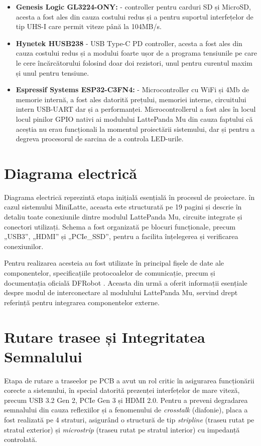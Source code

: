 \begin{itemize}
  \item \textbf{Genesis Logic GL3224-ONY:} - controller pentru carduri SD și MicroSD, acesta a fost ales din cauza costului redus și a pentru suportul interfețelor de tip UHS-I care permit viteze până la 104MB/s.
  \item \textbf{Hynetek HUSB238} -  USB Type-C PD controller, acesta a fost ales din cauza costului redus și a modului foarte ușor de a programa tensiunile pe care le cere încărcătorului folosind doar doi rezistori, unul pentru curentul maxim și unul pentru tensiune.
  \item \textbf{Espressif Systems ESP32-C3FN4:} - Microcontroller cu WiFi și 4Mb de memorie internă, a fost ales datorită prețului, memoriei interne, circuitului intern USB-UART dar și a performanței. Microcontrollerul a fost ales în locul locul pinilor GPIO nativi ai modulului LattePanda Mu din cauza faptului că aceștia nu erau funcționali la momentul proiectării sistemului, dar și pentru a degreva procesorul de sarcina de a controla LED-urile.
\end{itemize}


\section{Diagrama electrică}

Diagrama electrică reprezintă etapa inițială esențială în procesul de proiectare. în cazul sistemului MiniLatte, aceasta este structurată pe 19 pagini și descrie în detaliu toate conexiunile dintre modulul LattePanda Mu, circuite integrate și conectori utilizați. Schema a fost organizată pe blocuri funcționale, precum „USB3”, „HDMI” și „PCIe\_SSD”, pentru a facilita înțelegerea și verificarea conexiunilor.

Pentru realizarea acesteia au fost utilizate în principal fișele de date ale componentelor, specificațiile protocoalelor de comunicație, precum și documentația oficială DFRobot  \cite{lattepanda_docs} \cite{lattepanda_github}. Aceasta din urmă a oferit informații esențiale despre modul de interconectare al modulului LattePanda Mu, servind drept referință pentru integrarea componentelor externe.


\section{Rutare trasee și Integritatea Semnalului}
Etapa de rutare a traseelor pe \ac{PCB} a avut un rol critic în asigurarea funcționării corecte a sistemului, în special datorită prezenței interfețelor de mare viteză, precum USB 3.2 Gen 2, \ac{PCIe} Gen 3 și HDMI 2.0. Pentru a preveni degradarea semnalului din cauza reflexiilor și a fenomenului de \textit{crosstalk} (diafonie), placa a fost realizată pe 4 straturi, asigurând o structură de tip \textit{stripline} (traseu rutat pe stratul exterior) și \textit{microstrip} (traseu rutat pe stratul interior) cu impedanță controlată.


